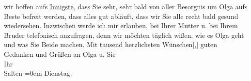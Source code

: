 \begin{ledgroupsized}[t]{13cm}
               wir hoffen aufs \uline{Innigste}, dass Sie sehr, sehr bald
               von aller Besorgnis um Olga aufs Beste befreit
               werden, dass alles gut abläuft, dass wir Sie alle recht bald gesund wiedersehen.
               Inzwischen werde ich mir erlauben, bei Ihrer Mutter u. bei Ihrem Bruder telefonisch anzufragen, denn wir möchten täglich
               wißen, wie es Olga geht und was Sie Beide
               machen.\pend
           \pstart
           Mit tausend herzlichsten Wünschen{[},{]} guten Gedanken und
               Grüßen an Olga u. Sie {\\[\baselineskip]}Ihr {\\[\baselineskip]}\spacefill\mbox{Salten}\pend
           \leftskip=0em{}\pstart
           Dienstag.\pend
           
         
         \endnumbering{}\end{ledgroupsized}  \newcommand{\dateiname}{L03494}\newcommand{\titel}{Felix Salten an Arthur Schnitzler, [10. 12. 1907]}\newcommand{\editorInnen}{Martin Anton Müller und Laura Untner}
      